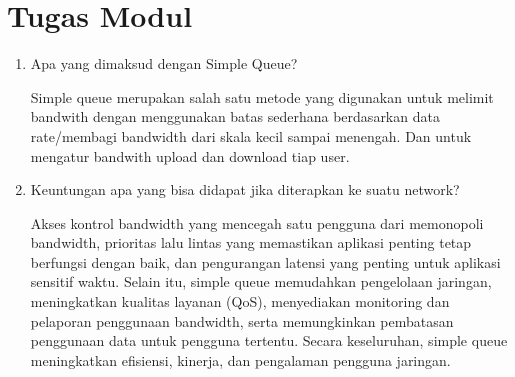 \section*{Tugas Modul} %
\begin{enumerate}
    \item Apa yang dimaksud dengan Simple Queue?
    
        Simple queue merupakan salah satu metode yang digunakan untuk melimit bandwith dengan menggunakan batas sederhana berdasarkan data rate/membagi bandwidth dari skala kecil sampai menengah. Dan untuk mengatur bandwith upload dan download tiap user.
    
    \item Keuntungan apa yang bisa didapat jika diterapkan ke suatu network?
        
        Akses kontrol bandwidth yang mencegah satu pengguna dari memonopoli bandwidth, prioritas lalu lintas yang memastikan aplikasi penting tetap berfungsi dengan baik, dan pengurangan latensi yang penting untuk aplikasi sensitif waktu. Selain itu, simple queue memudahkan pengelolaan jaringan, meningkatkan kualitas layanan (QoS), menyediakan monitoring dan pelaporan penggunaan bandwidth, serta memungkinkan pembatasan penggunaan data untuk pengguna tertentu. Secara keseluruhan, simple queue meningkatkan efisiensi, kinerja, dan pengalaman pengguna jaringan.
 
\end{enumerate}
